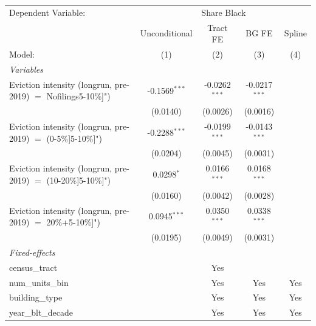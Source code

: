 \begingroup
\centering
\begin{tabular}{lcccc}
   \tabularnewline \midrule \midrule
   Dependent Variable: & \multicolumn{4}{c}{Share Black}\\
                                                                   & Unconditional   & Tract FE        & BG FE           & Spline \\   
   Model:                                                          & (1)             & (2)             & (3)             & (4)\\  
   \midrule
   \emph{Variables}\\
   Eviction intensity (longrun, pre-2019) $=$ Nofilings5-10\%]")   & -0.1569$^{***}$ & -0.0262$^{***}$ & -0.0217$^{***}$ &   \\   
                                                                   & (0.0140)        & (0.0026)        & (0.0016)        &   \\   
   Eviction intensity (longrun, pre-2019) $=$ (0-5\%]5-10\%]")     & -0.2288$^{***}$ & -0.0199$^{***}$ & -0.0143$^{***}$ &   \\   
                                                                   & (0.0204)        & (0.0045)        & (0.0031)        &   \\   
   Eviction intensity (longrun, pre-2019) $=$ (10-20\%]5-10\%]")   & 0.0298$^{*}$    & 0.0166$^{***}$  & 0.0168$^{***}$  &   \\   
                                                                   & (0.0160)        & (0.0042)        & (0.0028)        &   \\   
   Eviction intensity (longrun, pre-2019) $=$ 20\%+5-10\%]")       & 0.0945$^{***}$  & 0.0350$^{***}$  & 0.0338$^{***}$  &   \\   
                                                                   & (0.0195)        & (0.0049)        & (0.0031)        &   \\   
   \midrule
   \emph{Fixed-effects}\\
   census\_tract                                                   &                 & Yes             &                 & \\  
   num\_units\_bin                                                 &                 & Yes             & Yes             & Yes\\  
   building\_type                                                  &                 & Yes             & Yes             & Yes\\  
   year\_blt\_decade                                               &                 & Yes             & Yes             & Yes\\  

\end{tabular}
